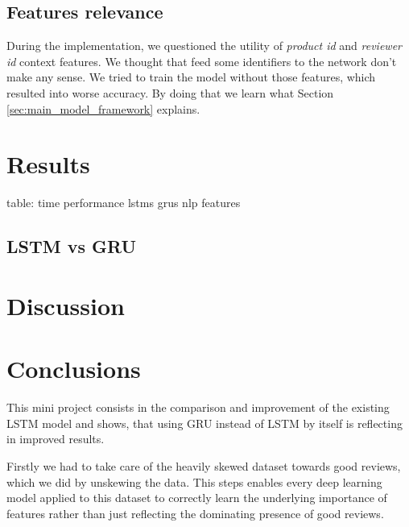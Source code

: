 \documentclass[a4paper,11pt]{article}
\begin{document}
\subsection{Features relevance}
During the implementation, we questioned the utility of \textit{product id} and \textit{reviewer id} context features. We thought that feed some identifiers to the network don't make any sense. We tried to train the model without those features, which resulted into worse accuracy. By doing that we learn what Section \ref{sec:main_model_framework} explains.

\section{Results}


table: time  performance
lstms
grus
nlp features

\subsection{LSTM vs GRU}

\section{Discussion}


\section{Conclusions}

This mini project consists in the comparison and improvement of the existing LSTM model \cite{wei} and shows, that using GRU instead of LSTM by itself is reflecting in improved results. 
 
Firstly we had to take care of the heavily skewed dataset towards good reviews, which we did by unskewing the data. This steps enables every deep learning model applied to this dataset to correctly learn the underlying importance of features rather than just reflecting the dominating presence of good reviews.
\end{document}
